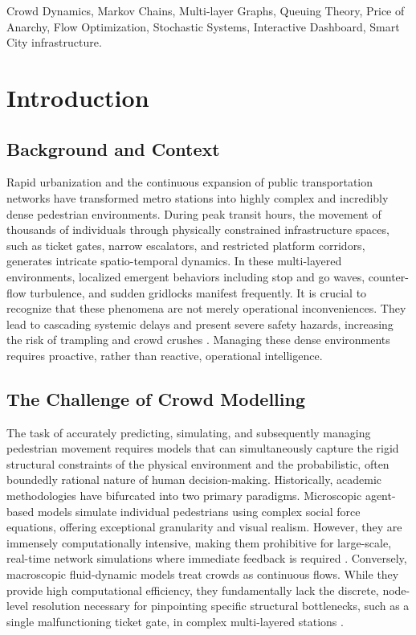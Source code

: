 \documentclass[conference]{IEEEtran}
\begin{document}
\begin{IEEEkeywords}
Crowd Dynamics, Markov Chains, Multi-layer Graphs, Queuing Theory, Price of Anarchy, Flow Optimization, Stochastic Systems, Interactive Dashboard, Smart City infrastructure.
\end{IEEEkeywords}

\section{Introduction}

\subsection{Background and Context}
Rapid urbanization and the continuous expansion of public transportation networks have transformed metro stations into highly complex and incredibly dense pedestrian environments. During peak transit hours, the movement of thousands of individuals through physically constrained infrastructure spaces, such as ticket gates, narrow escalators, and restricted platform corridors, generates intricate spatio-temporal dynamics. In these multi-layered environments, localized emergent behaviors including stop and go waves, counter-flow turbulence, and sudden gridlocks manifest frequently. It is crucial to recognize that these phenomena are not merely operational inconveniences. They lead to cascading systemic delays and present severe safety hazards, increasing the risk of trampling and crowd crushes \cite{b1}. Managing these dense environments requires proactive, rather than reactive, operational intelligence.

\subsection{The Challenge of Crowd Modelling}
The task of accurately predicting, simulating, and subsequently managing pedestrian movement requires models that can simultaneously capture the rigid structural constraints of the physical environment and the probabilistic, often boundedly rational nature of human decision-making. Historically, academic methodologies have bifurcated into two primary paradigms. Microscopic agent-based models simulate individual pedestrians using complex social force equations, offering exceptional granularity and visual realism. However, they are immensely computationally intensive, making them prohibitive for large-scale, real-time network simulations where immediate feedback is required \cite{b6}. Conversely, macroscopic fluid-dynamic models treat crowds as continuous flows. While they provide high computational efficiency, they fundamentally lack the discrete, node-level resolution necessary for pinpointing specific structural bottlenecks, such as a single malfunctioning ticket gate, in complex multi-layered stations \cite{b4}.
\end{document}
